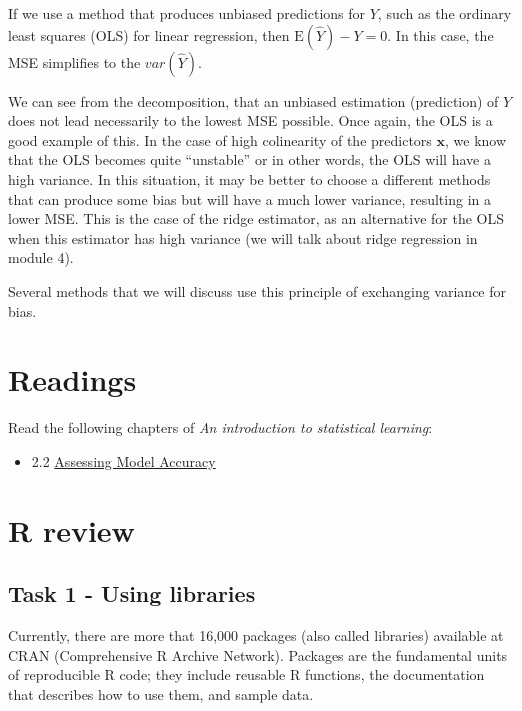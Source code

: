 \documentclass[
]{book}
\providecommand{\tightlist}{%
  \setlength{\itemsep}{0pt}\setlength{\parskip}{0pt}}
\begin{document}
If we use a method that produces unbiased predictions for \(Y\), such as the
ordinary least squares (OLS) for linear regression, then \(\mathrm{E}(\hat{Y}) - Y =0\).
In this case, the MSE simplifies to the \(var(\hat{Y})\).

We can see from the
decomposition, that an unbiased estimation (prediction) of \(Y\) does not lead
necessarily to the lowest MSE possible. Once again, the OLS is a good example of
this. In the case of high colinearity of the predictors \(\mathbf x\), we know that
the OLS becomes quite ``unstable'' or in other words, the OLS will have a high
variance. In this situation, it may be better to choose a different methods
that can produce some bias but will have a much lower variance, resulting in a
lower MSE. This is the case of the ridge estimator, as an alternative for the OLS when this estimator has high variance (we will talk about ridge regression in module 4).

Several methods that we will discuss use this principle of exchanging variance
for bias.

\hypertarget{maccuracy.read}{%
\section{Readings}\label{maccuracy.read}}

Read the following chapters of \emph{An introduction to statistical learning}:

\begin{itemize}
\tightlist
\item
  2.2 \href{http://faculty.marshall.usc.edu/gareth-james/ISL/ISLR\%20Seventh\%20Printing.pdf\#page=42}{Assessing Model Accuracy}
\end{itemize}

\hypertarget{R.02}{%
\section{R review}\label{R.02}}

\hypertarget{task-1---using-libraries}{%
\subsection{Task 1 - Using libraries}\label{task-1---using-libraries}}

Currently, there are more that 16,000 packages (also called libraries)
available at CRAN (Comprehensive R Archive Network). Packages are the
fundamental units of reproducible R code; they include reusable
R functions, the documentation that describes how to use them, and sample data.
\end{document}
